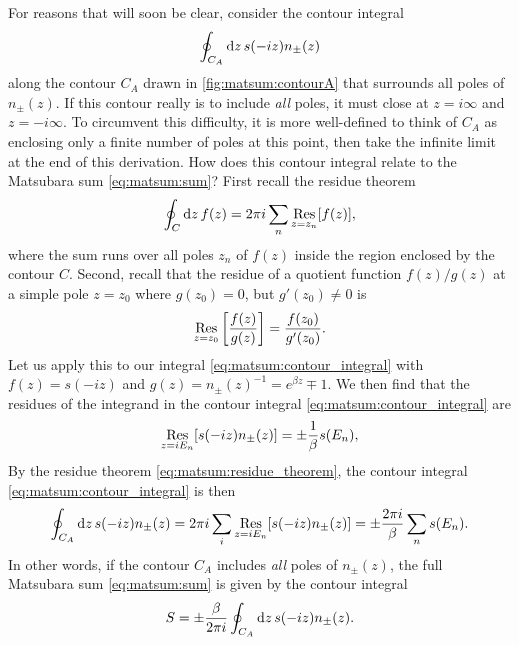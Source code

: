 For reasons that will soon be clear, consider the contour integral
\begin{equation}
	\oint_{C_A} \mathop{}\!\mathrm{d} z \, s(-iz) n_\pm(z)
\label{eq:matsum:contour_integral}
\end{equation}
along the contour $C_A$ drawn in \cref{fig:matsum:contourA} that surrounds all poles of $n_\pm(z)$.
If this contour really is to include \emph{all} poles, it must close at $z = i \infty$ and $z = -i \infty$.
To circumvent this difficulty, it is more well-defined to think of $C_A$ as enclosing only a finite number of poles at this point, then take the infinite limit at the end of this derivation.
How does this contour integral relate to the Matsubara sum \eqref{eq:matsum:sum}?
First recall the residue theorem
\begin{equation}
	\oint_C \mathop{}\!\mathrm{d} z \, f(z) = 2 \pi i \sum_n \operatorname*{Res}_{z=z_n} [f(z)] ,
\label{eq:matsum:residue_theorem}
\end{equation}
where the sum runs over all poles $z_n$ of $f(z)$ inside the region enclosed by the contour $C$.
Second, recall that the residue of a quotient function $f(z) / g(z)$ at a simple pole $z = z_0$ where $g(z_0) = 0$, but $g'(z_0) \neq 0$ is 
\begin{equation}
	\operatorname*{Res}_{z=z_0} \left[ \frac{f(z)}{g(z)} \right] = \frac{f(z_0)}{g'(z_0)} .
\label{eq:matsum:residue_quotient}
\end{equation}
Let us apply this to our integral \eqref{eq:matsum:contour_integral} with $f(z) = s(-iz)$ and $g(z) = n_\pm(z)^{-1} = e^{\beta z} \mp 1$.
We then find that the residues of the integrand in the contour integral \eqref{eq:matsum:contour_integral} are
\begin{equation}
	\operatorname*{Res}_{z = i E_n} [s(-iz) n_\pm(z)] = \pm \frac{1}{\beta} s(E_n) ,
\end{equation}
By the residue theorem \eqref{eq:matsum:residue_theorem}, the contour integral \eqref{eq:matsum:contour_integral} is then
\begin{equation}
	\oint_{C_A} \mathop{}\!\mathrm{d} z \, s(-iz) n_\pm(z) = 2 \pi i \sum_i \operatorname*{Res}_{z = i E_n}[s(-i z) n_\pm(z)]
	                                  = \pm \frac{2 \pi i}{\beta} \sum_n s(E_n) .
\label{eq:matsum:connection_integral_sum}
\end{equation}
In other words, if the contour $C_A$ includes \emph{all} poles of $n_\pm(z)$, the full Matsubara sum \eqref{eq:matsum:sum} is given by the contour integral
\begin{equation}
	S = \pm \frac{\beta}{2 \pi i} \oint_{C_A} \mathop{}\!\mathrm{d} z \, s(-iz) n_\pm(z) .
\label{eq:matsum:sum_as_contour_integral}
\end{equation}

